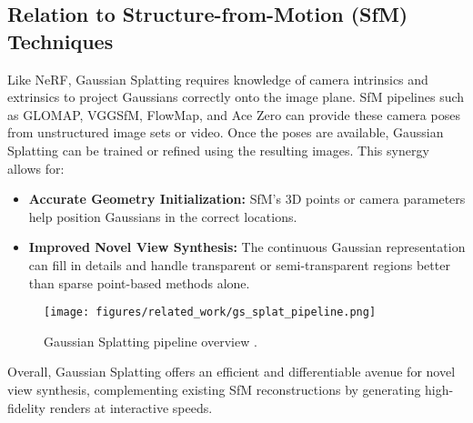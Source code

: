 \subsection{Relation to Structure-from-Motion (SfM) Techniques}
Like NeRF, Gaussian Splatting requires knowledge of camera intrinsics and extrinsics to project Gaussians correctly onto the image plane.
SfM pipelines such as GLOMAP, VGGSfM, FlowMap, and Ace Zero can provide these camera poses from unstructured image sets or video.
Once the poses are available, Gaussian Splatting can be trained or refined using the resulting images.
This synergy allows for:
\begin{itemize}
\item \textbf{Accurate Geometry Initialization:} SfM's 3D points or camera parameters help position Gaussians in the correct locations.
\item \textbf{Improved Novel View Synthesis:} The continuous Gaussian representation can fill in details and handle transparent or semi-transparent regions better than sparse point-based methods alone.
\end{itemize}

\begin{figure}[h]
    \centering
    \texttt{[image: figures/related\_work/gs\_splat\_pipeline.png]}
    \caption{Gaussian Splatting pipeline overview \cite{kerbl20233dgaussiansplattingrealtime}.}
    \label{fig:gaussian_splatting}
\end{figure}

Overall, Gaussian Splatting offers an efficient and differentiable avenue for novel view synthesis, complementing existing SfM reconstructions by generating high-fidelity renders at interactive speeds.